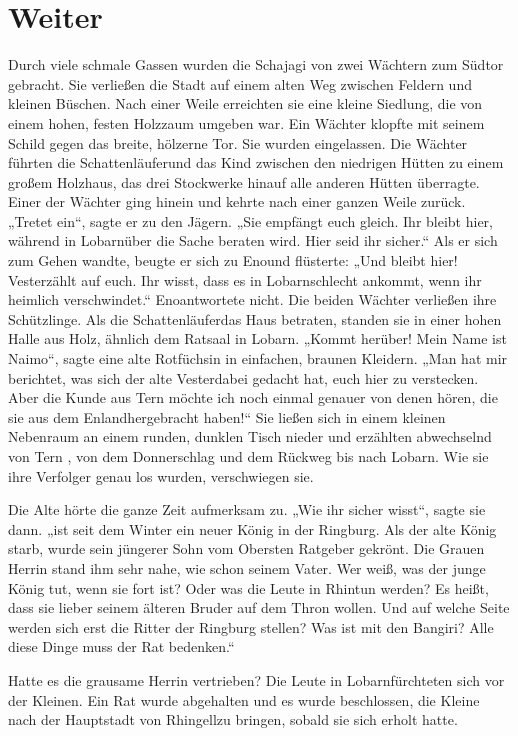 \documentclass[12pt,a4paper,onecolumn,twoside,ngerman]{book}
\newcommand{\Tern}{Tern }
\newcommand{\Bangiri}{Bangiri}
\newcommand{\Enland}{Enland}
\newcommand{\Schattenjager}{Schattenläufer}
\newcommand{\Eno}{Eno}
\newcommand{\Lobarn}{Lobarn}
\newcommand{\Vester}{Vester}
\newcommand{\Naimo}{Naimo}
\newcommand{\Rhingell}{Rhingell}
\newcommand{\Rhin}{Rhin}
\begin{document}
\section{Weiter}
Durch viele schmale Gassen wurden die Schajagi von zwei Wächtern zum Südtor gebracht. Sie verließen die Stadt auf einem alten Weg zwischen Feldern und kleinen Büschen. Nach einer Weile erreichten sie eine kleine Siedlung, die von einem hohen, festen Holzzaum umgeben war. Ein Wächter klopfte mit seinem Schild gegen das breite, hölzerne Tor. Sie wurden eingelassen. Die Wächter führten die \Schattenjager und das Kind zwischen den niedrigen Hütten zu einem großem Holzhaus, das drei Stockwerke hinauf alle anderen Hütten überragte. Einer der Wächter ging hinein und kehrte nach einer ganzen Weile zurück.
„Tretet ein“, sagte er zu den Jägern. „Sie empfängt euch gleich. Ihr bleibt hier, während in \Lobarn über die Sache beraten wird. Hier seid ihr sicher.“ Als er sich zum Gehen wandte, beugte er sich zu \Eno und flüsterte: „Und bleibt hier! \Vester zählt auf euch. Ihr wisst, dass es in \Lobarn schlecht ankommt, wenn ihr heimlich verschwindet.“
\Eno antwortete nicht. Die beiden Wächter verließen ihre Schützlinge.
Als die \Schattenjager das Haus betraten, standen sie in einer hohen Halle aus Holz, ähnlich dem Ratsaal in \Lobarn.
„Kommt herüber! Mein Name ist \Naimo “, sagte eine alte Rotfüchsin in einfachen, braunen Kleidern. „Man hat mir berichtet, was sich der alte \Vester dabei gedacht hat, euch hier zu verstecken. Aber die Kunde aus \Tern möchte ich noch einmal genauer von denen hören, die sie aus dem \Enland hergebracht haben!“
Sie ließen sich in einem kleinen Nebenraum an einem runden, dunklen Tisch nieder und erzählten abwechselnd von \Tern, von dem Donnerschlag und dem Rückweg bis nach \Lobarn. Wie sie ihre Verfolger genau los wurden, verschwiegen sie.

Die Alte hörte die ganze Zeit aufmerksam zu.
„Wie ihr sicher wisst“, sagte sie dann. „ist seit dem Winter ein neuer König in der Ringburg. Als der alte König starb, wurde sein jüngerer Sohn vom Obersten Ratgeber gekrönt. Die Grauen Herrin stand ihm sehr nahe, wie schon seinem Vater. Wer weiß, was der junge König tut, wenn sie fort ist? Oder was die Leute in \Rhin tun werden? Es heißt, dass sie lieber seinem älteren Bruder auf dem Thron wollen. Und auf welche Seite werden sich erst die Ritter der Ringburg stellen? Was ist mit den \Bangiri? Alle diese Dinge muss der Rat bedenken.“  

Hatte es die grausame Herrin vertrieben?
Die Leute in \Lobarn fürchteten sich vor der Kleinen. Ein Rat wurde abgehalten und es wurde beschlossen, die Kleine nach der Hauptstadt von \Rhingell zu bringen, sobald sie sich erholt hatte.
\end{document}
